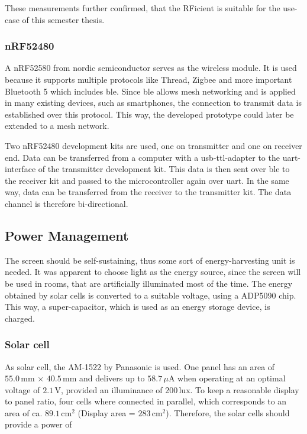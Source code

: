 These measurements further confirmed, that the RFicient is suitable for the use-case of this semester thesis.
\clearpage
\subsubsection{nRF52480}
A nRF52580 from nordic semiconductor serves as the wireless module.
It is used because it supports multiple protocols like Thread, Zigbee and more important Bluetooth 5 which includes \acf{ble}\cite{nrfpb}.
Since \acs{ble} allows mesh networking and is applied in many existing devices, such as smartphones, the connection to transmit data is established over this protocol.
This way, the developed prototype could later be extended to a mesh network.

Two nRF52480 development kits are used, one on transmitter and one on receiver end.
Data can be transferred from a computer with a \acs{usb}-\acs{ttl}-adapter to the \acs{uart}-interface of the transmitter development kit.
This data is then sent over \acs{ble} to the receiver kit and passed to the microcontroller again over \acs{uart}.
In the same way, data can be transferred from the receiver to the transmitter kit.
The data channel is therefore bi-directional. 

\subsection{Power Management}
The screen should be self-sustaining, thus some sort of energy-harvesting unit is needed.
It was apparent to choose light as the energy source, since the screen will be used in rooms, that are artificially illuminated most of the time.
The energy  obtained by solar cells is converted to a suitable voltage, using a ADP5090 chip.
This way, a super-capacitor, which is used as an energy storage device, is charged.

\subsubsection{Solar cell}
As solar cell, the AM-1522 by Panasonic is used.
One panel has an area of $55.0\,\text{mm}\,\times\,40.5\,\text{mm}$ and delivers up to $58.7\, \mu\text{A}$ when operating at an optimal voltage of $2.1\,\text{V}$, provided an illuminance of 200\,lux.
To keep a reasonable display to panel ratio, four cells where connected in parallel, which corresponds to an area of ca. $89.1\,\text{cm}^2$ (Display area = $283\,\text{cm}^2$). Therefore, the solar cells should provide a power of


